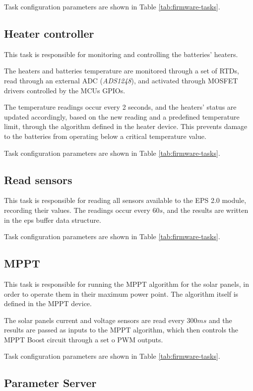 Task configuration parameters are shown in Table \ref{tab:firmware-tasks}.

\subsection{Heater controller}

This task is responsible for monitoring and controlling the batteries' heaters.

The heaters and batteries temperature are monitored through a set of RTDs, read through an external ADC (\textit{ADS1248}), and activated through MOSFET drivers controlled by the MCUs GPIOs.

The temperature readings occur every 2 seconds, and the heaters' status are updated accordingly, based on the new reading and a predefined temperature limit, through the algorithm defined in the heater device.
This prevents damage to the batteries from operating below a critical temperature value.

Task configuration parameters are shown in Table \ref{tab:firmware-tasks}.

\subsection{Read sensors}

This task is responsible for reading all sensors available to the EPS 2.0 module, recording their values.
The readings occur every \(60 s\), and the results are written in the eps buffer data structure.

Task configuration parameters are shown in Table \ref{tab:firmware-tasks}.

\subsection{MPPT}

This task is responsible for running the MPPT algorithm for the solar panels, in order to operate them in their maximum power point.
The algorithm itself is defined in the MPPT device.

The solar panels current and voltage sensors are read every \(300 ms\) and the results are passed as inputs to the MPPT algorithm, which then controls the MPPT Boost circuit through a set o PWM outputs.

Task configuration parameters are shown in Table \ref{tab:firmware-tasks}.

\subsection{Parameter Server}

